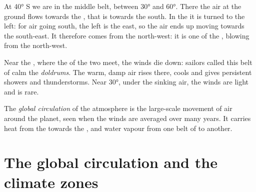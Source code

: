 \begin{example}\label{ex:g8:winds-global-circulation:40s}
At \ang{40} S we are in the middle belt, between \ang{30} and \ang{60}.
There the air at the ground flows towards the , that is towards the
south. In the  it is turned to the left: for air going
south, the left is the east, so the air ends up moving towards the
south-east. It therefore comes from the north-west: it is one of the
, blowing from the north-west.
\end{example}

Near the , where the  of the two  meet,
the winds die down: sailors called this belt of calm the
\emph{doldrums}. The warm, damp air rises there, cools and gives
persistent showers and thunderstorms. Near \ang{30}, under the sinking air,
the winds are light and  is rare.

\begin{definition}\label{def:g8:winds-global-circulation:circulation}
The \emph{global circulation} of the
atmosphere is the large-scale movement of air around the planet, seen
when the winds are averaged over many years. It carries heat from the
 towards the , and water vapour from one belt of  to
another.
\end{definition}

\section{The global circulation and the climate zones}

